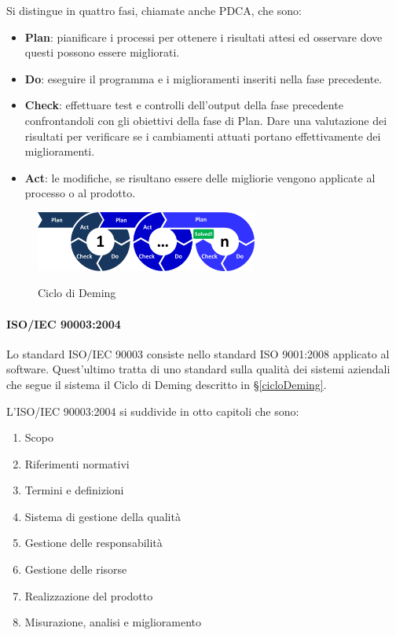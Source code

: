 	Si distingue in quattro fasi, chiamate anche PDCA, che sono:

	\begin{itemize}
		\item \textbf{Plan}: pianificare i processi per ottenere i risultati attesi ed osservare dove questi possono essere migliorati.
		\item \textbf{Do}: eseguire il programma e i miglioramenti inseriti nella fase precedente.
		\item \textbf{Check}: effettuare test e controlli dell'output della fase precedente confrontandoli con gli obiettivi della fase di Plan. Dare una valutazione dei risultati per verificare se i cambiamenti attuati portano effettivamente dei miglioramenti.
		\item \textbf{Act}: le modifiche, se risultano essere delle migliorie vengono applicate al processo o al prodotto.
	\end{itemize}

	\begin{figure}[H]
		\centering
		\includegraphics[width=0.65\textwidth]{img/PDCA}
		\label{fig:PDCA}
		\caption[Ciclo di Deming]{Ciclo di Deming\protect\footnotemark}
	\end{figure}


	\paragraph{ISO/IEC 90003:2004}
	Lo standard ISO/IEC 90003 consiste nello standard ISO 9001:2008 applicato al software. Quest'ultimo tratta di uno standard sulla qualità dei sistemi aziendali che segue il sistema il Ciclo di Deming descritto in \S\ref{cicloDeming}.

	L'ISO/IEC 90003:2004 si suddivide in otto capitoli che sono:

	\begin{enumerate}
		\item Scopo
		\item Riferimenti normativi
		\item Termini e definizioni
		\item Sistema di gestione della qualità
		\item Gestione delle responsabilità
		\item Gestione delle risorse
		\item Realizzazione del prodotto
		\item Misurazione, analisi e miglioramento
	\end{enumerate}


